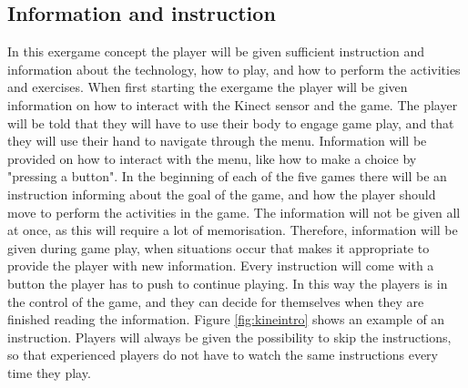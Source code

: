 \subsection{Information and instruction}
In this exergame concept the player will be given sufficient instruction and information about the technology, how to play, and how to perform the activities and exercises. When first starting the exergame the player will be given information on how to interact with the Kinect sensor and the game. The player will be told that they will have to use their body to engage game play, and that they will use their hand to navigate through the menu. Information will be provided on how to interact with the menu, like how to make a choice by "pressing a button". In the beginning of each of the five games there will be an instruction informing about the goal of the game, and how the player should move to perform the activities in the game. The information will not be given all at once, as this will require a lot of memorisation. Therefore, information will be given during game play, when situations occur that makes it appropriate to provide the player with new information. Every instruction will come with a button the player has to push to continue playing. In this way the players is in the control of the game, and they can decide for themselves when they are finished reading the information. Figure \ref{fig:kineintro} shows an example of an instruction. Players will always be given the possibility to skip the instructions, so that experienced players do not have to watch the same instructions every time they play.

